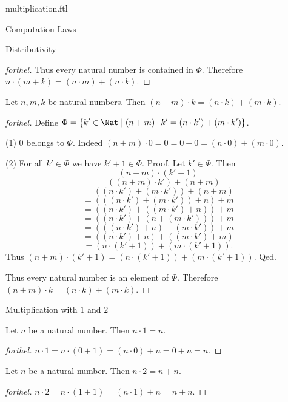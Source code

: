 \documentclass{naproche-library}
\begin{document}
\begin{smodule}[title=Multiplication]{multiplication.ftl}
\begin{sfragment}{Computation Laws}
\begin{sfragment}{Distributivity}
\begin{proof}[forthel]
      Thus every natural number is contained in $\Phi$.
      Therefore $n \cdot (m + k) = (n \cdot m) + (n \cdot k)$.
    \end{proof}

    \begin{proposition}[forthel,id=ARITHMETIC_06_5742967566368768]
      Let $n, m, k$ be natural numbers.
      Then $(n + m) \cdot k = (n \cdot k) + (m \cdot k)$.
    \end{proposition}
    \begin{proof}[forthel]
      Define $\Phi = \{ k' \in \Nat \mid (n + m) \cdot k' = (n \cdot k') + (m \cdot k') \}$.

      (1) $0$ belongs to $\Phi$.
      Indeed $(n + m) \cdot 0
        = 0
        = 0 + 0
        = (n \cdot 0) + (m \cdot 0)$.

      (2) For all $k' \in \Phi$ we have $k' + 1 \in \Phi$. \newline
      Proof.
        Let $k' \in \Phi$.
        Then
        \[  (n + m) \cdot (k' + 1)                        \]
        \[    = ((n + m) \cdot k') + (n + m)              \]
        \[    = ((n \cdot k') + (m \cdot k')) + (n + m)   \]
        \[    = (((n \cdot k') + (m \cdot k')) + n) + m   \]
        \[    = ((n \cdot k') + ((m \cdot k') + n)) + m   \]
        \[    = ((n \cdot k') + (n + (m \cdot k'))) + m   \]
        \[    = (((n \cdot k') + n) + (m \cdot k')) + m   \]
        \[    = ((n \cdot k') + n) + ((m \cdot k') + m)   \]
        \[    = (n \cdot (k' + 1)) + (m \cdot (k' + 1)).  \]
        Thus $(n + m) \cdot (k' + 1) = (n \cdot (k' + 1)) + (m \cdot (k' + 1))$.
      Qed.

      Thus every natural number is an element of $\Phi$.
      Therefore $(n + m) \cdot k = (n \cdot k) + (m \cdot k)$.
    \end{proof}
  \end{sfragment}

  \begin{sfragment}{Multiplication with $1$ and $2$}
    \begin{proposition}[forthel,id=ARITHMETIC_06_2910559821365248]
      Let $n$ be a natural number.
      Then $n \cdot 1 = n$.
    \end{proposition}
    \begin{proof}[forthel]
      $n \cdot 1
        = n \cdot (0 + 1)
        = (n \cdot 0) + n
        = 0 + n
        = n$.
    \end{proof}

    \begin{corollary}[forthel,id=ARITHMETIC_06_5679541582299136]
      Let $n$ be a natural number.
      Then $n \cdot 2 = n + n$.
    \end{corollary}
    \begin{proof}[forthel]
      $n \cdot 2
        = n \cdot (1 + 1)
        = (n \cdot 1) + n
        = n + n$.
    \end{proof}
  \end{sfragment}


\end{sfragment}
\end{smodule}
\end{document}
